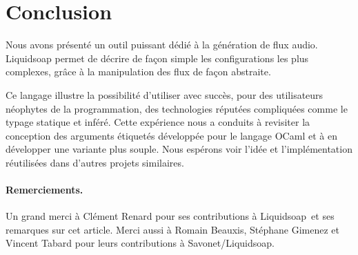 \documentclass[twoside]{article}
\newcommand{\liquidsoap}{Liquidsoap}
\newcommand{\savonet}{Savonet}
\theoremstyle{plain}
\theoremstyle{definition}
\theoremstyle{remark}
\begin{document}
\section*{Conclusion}
Nous avons présenté un outil puissant dédié à la génération de flux 
audio. \liquidsoap{} permet de décrire de façon simple les configurations les 
plus complexes, grâce à la manipulation des flux de façon abstraite.

Ce langage illustre la possibilité d'utiliser avec succès,
pour des utilisateurs néophytes de la programmation,
des technologies réputées compliquées comme le typage statique et inféré.
Cette expérience nous a conduits à revisiter la conception des arguments 
étiquetés développée pour le langage OCaml
et à en développer une variante plus souple.
Nous espérons voir l'idée et l'implémentation réutilisées dans d'autres 
projets similaires.

\paragraph{Remerciements.}
Un grand merci à Clément Renard
pour ses contributions à \liquidsoap\ et ses remarques sur cet article.
Merci aussi à Romain Beauxis, Stéphane Gimenez et Vincent Tabard
pour leurs contributions à \savonet{}/\liquidsoap.
\end{document}
